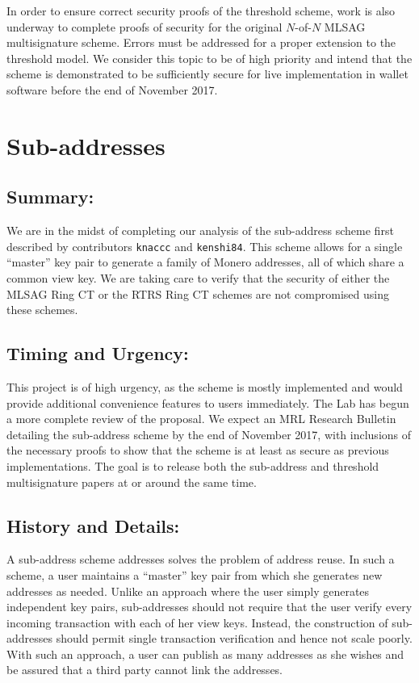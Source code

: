 \documentclass[12pt,english]{mrl}
\theoremstyle{definition}
\numberwithin{equation}{section}
\numberwithin{figure}{section}
\numberwithin{equation}{section}
\numberwithin{equation}{section}
\numberwithin{figure}{section}
\begin{document}
In order to ensure correct security proofs of the threshold scheme, work is also underway to complete proofs of security for the original $N$-of-$N$ MLSAG multisignature scheme. Errors must be addressed for a proper extension to the threshold model. We consider this topic to be of high priority and intend that the scheme is demonstrated to be sufficiently secure for live implementation in wallet software before the end of November 2017.




\section{Sub-addresses}


\subsection{Summary:} 

We are in the midst of completing our analysis of the sub-address scheme first described by contributors \texttt{knaccc} and \texttt{kenshi84}. This scheme allows for a single ``master'' key pair to generate a family of Monero addresses, all of which share a common view key. We are taking care to verify that the security of either the MLSAG Ring CT or the RTRS Ring CT schemes are not compromised using these schemes.

\subsection{Timing and Urgency:} 

This project is of high urgency, as the scheme is mostly implemented and would provide additional convenience features to users immediately. The Lab has begun a more complete review of the proposal. We expect an MRL Research Bulletin detailing the sub-address scheme by the end of November 2017, with inclusions of the necessary proofs to show that the scheme is at least as secure as previous implementations. The goal is to release both the sub-address and threshold multisignature papers at or around the same time.

\subsection{History and Details:} 

A sub-address scheme addresses solves the problem of address reuse. In such a scheme, a user maintains a ``master'' key pair from which she generates new addresses as needed. Unlike an approach where the user simply generates independent key pairs, sub-addresses should not require that the user verify every incoming transaction with each of her view keys. Instead, the construction of sub-addresses should permit single transaction verification and hence not scale poorly. With such an approach, a user can publish as many addresses as she wishes and be assured that a third party cannot link the addresses. 
\end{document}
